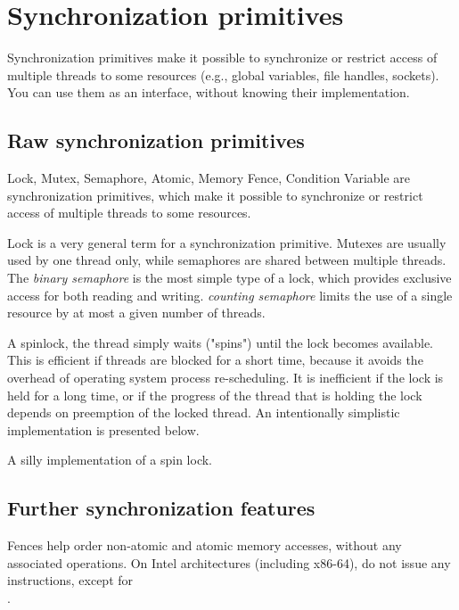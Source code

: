\section{Synchronization primitives}

Synchronization primitives make it possible to synchronize or restrict access of multiple threads to some resources (e.g., global variables, file handles, sockets). You can use them as an interface, without knowing their implementation. 

\subsection{Raw synchronization primitives}

Lock, Mutex, Semaphore, Atomic, Memory Fence, Condition Variable are synchronization primitives, which make it possible to synchronize or restrict access of multiple threads to some resources. 

Lock is a very general term for a synchronization primitive. Mutexes are usually used by one thread only, while semaphores are shared between multiple threads. The \emph{binary semaphore} is the most simple type of a lock, which provides exclusive access for both reading and writing. \emph{counting semaphore} limits the use of a single resource by at most a given number of threads. 

A spinlock, the thread simply waits ("spins") until the lock becomes available. This is efficient if threads are blocked for a short time, because it avoids the overhead of operating system process re-scheduling. It is inefficient if the lock is held for a long time, or if the progress of the thread that is holding the lock depends on preemption of the locked thread. An intentionally simplistic implementation is presented below.

\raggedbottom
\begin{codebox}[]{\href{https://godbolt.org/z/Kf4ocjhqs}{\ExternalLink}}
\footnotesize A silly implementation of a spin lock.
\tcblower
{}
\end{codebox}

\subsection{Further synchronization features}

Fences help order non-atomic and atomic memory accesses, without any associated operations. On Intel architectures (including x86-64),  do not issue any instructions, except for\\.

